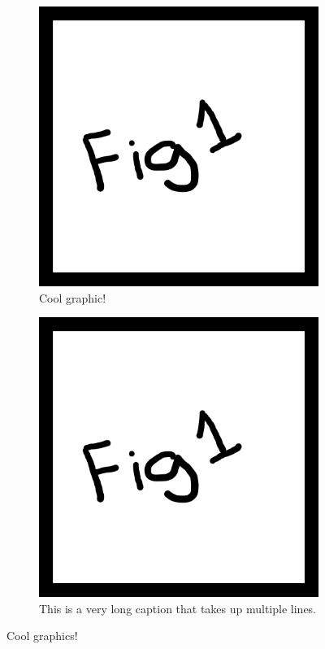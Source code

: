 \begin{figure}[!htb]
	\centering
    \begin{subfigure}[t]{0.49\textwidth}
        \centering
		\includegraphics[width=\textwidth,keepaspectratio]{Figures/ExampleFigure1.png}
	    \caption{Cool graphic!}
        \label{fig:Example4a}
    \end{subfigure}
    \begin{subfigure}[t]{0.49\textwidth}
        \centering
		\includegraphics[width=\textwidth,keepaspectratio]{Figures/ExampleFigure1.png}
	    \caption{This is a very long caption that takes up multiple lines.}
        \label{fig:Example4b}
    \end{subfigure}
    \caption{Cool graphics!}
    \label{fig:Example4}
\end{figure}


